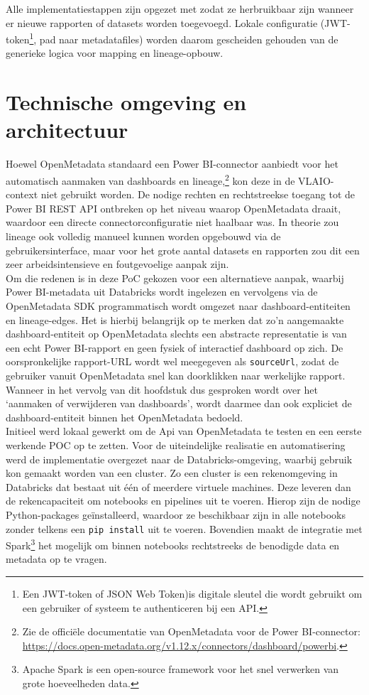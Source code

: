 Alle implementatiestappen zijn opgezet met zodat ze herbruikbaar zijn wanneer er nieuwe rapporten of datasets worden toegevoegd. Lokale configuratie (JWT-token\footnote{Een JWT-token of JSON Web Token)is digitale sleutel die wordt gebruikt om een gebruiker of systeem te authenticeren bij een API.}, pad naar metadatafiles) worden daarom gescheiden gehouden van de generieke logica voor mapping en lineage-opbouw.\\

\section{Technische omgeving en architectuur}

Hoewel OpenMetadata standaard een Power BI-connector aanbiedt voor het automatisch aanmaken van dashboards en lineage,\footnote{Zie de officiële documentatie van OpenMetadata voor de Power BI-connector: \url{https://docs.open-metadata.org/v1.12.x/connectors/dashboard/powerbi}.} kon deze in de VLAIO-context niet gebruikt worden. De nodige rechten en rechtstreekse toegang tot de Power BI REST API ontbreken op het niveau waarop OpenMetadata draait, waardoor een directe connectorconfiguratie niet haalbaar was. In theorie zou lineage ook volledig manueel kunnen worden opgebouwd via de gebruikersinterface, maar voor het grote aantal datasets en rapporten zou dit een zeer arbeidsintensieve en foutgevoelige aanpak zijn.\\

Om die redenen is in deze PoC gekozen voor een alternatieve aanpak, waarbij Power BI-metadata uit Databricks wordt ingelezen en vervolgens via de OpenMetadata SDK programmatisch wordt omgezet naar dashboard-entiteiten en li\-ne\-age-ed\-ges. Het is hierbij belangrijk op te merken dat zo'n aangemaakte dashboard-entiteit op OpenMetadata slechts een abstracte representatie is van een echt Power BI-rapport en geen fysiek of interactief dashboard op zich. De oorspronkelijke rapport-URL wordt wel meegegeven als \texttt{sourceUrl}, zodat de gebruiker vanuit OpenMetadata snel kan doorklikken naar werkelijke rapport. Wanneer in het vervolg van dit hoofdstuk dus gesproken wordt over het `aanmaken of verwijderen van dashboards', wordt daarmee dan ook expliciet de dash\-board-en\-ti\-teit binnen het OpenMetadata bedoeld.\\

Initieel werd lokaal gewerkt om de Api van OpenMetadata te testen en een eerste werkende POC op te zetten. Voor de uiteindelijke realisatie en automatisering werd de implementatie overgezet naar de Data\-bricks-omgeving, waarbij gebruik kon gemaakt worden van een cluster. Zo een cluster is een rekenomgeving in Databricks dat bestaat uit één of meerdere virtuele machines. Deze leveren dan de rekencapaciteit om notebooks en pipelines uit te voeren. Hierop zijn de nodige Python-packages geïnstalleerd, waardoor ze beschikbaar zijn in alle notebooks zonder telkens een \texttt{pip install} uit te voeren. Bovendien maakt de integratie met Spark\footnote{Apache Spark is een open-source framework voor het snel verwerken van grote hoeveelheden data.} het mogelijk om binnen notebooks rechtstreeks de benodigde data en metadata op te vragen.\\

